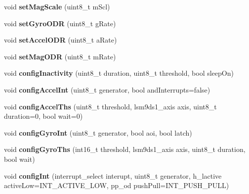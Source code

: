 \begin{DoxyCompactItemize}
\mbox{\label{classLSM9DS1_ad7604159a07b0d088cdfb6ba4a0093b0}} 
void {\bfseries set\+Mag\+Scale} (uint8\+\_\+t m\+Scl)
\item 
\mbox{\label{classLSM9DS1_ab8fc33c8da4fc5c379e880ff57d331fa}} 
void {\bfseries set\+Gyro\+O\+DR} (uint8\+\_\+t g\+Rate)
\item 
\mbox{\label{classLSM9DS1_a76d72839cdecc3f1c4ee6fff578182c5}} 
void {\bfseries set\+Accel\+O\+DR} (uint8\+\_\+t a\+Rate)
\item 
\mbox{\label{classLSM9DS1_a8bc672fba680edc468a643fd58046b41}} 
void {\bfseries set\+Mag\+O\+DR} (uint8\+\_\+t m\+Rate)
\item 
\mbox{\label{classLSM9DS1_a1e318c5e7c1d500c3ab2602c46265354}} 
void {\bfseries config\+Inactivity} (uint8\+\_\+t duration, uint8\+\_\+t threshold, bool sleep\+On)
\item 
\mbox{\label{classLSM9DS1_a1e8ebc6c1e3876d8936197dc93f76717}} 
void {\bfseries config\+Accel\+Int} (uint8\+\_\+t generator, bool and\+Interrupts=false)
\item 
\mbox{\label{classLSM9DS1_acebcf64ab4e6ea7ed7a23c09ef16afe9}} 
void {\bfseries config\+Accel\+Ths} (uint8\+\_\+t threshold, lsm9ds1\+\_\+axis axis, uint8\+\_\+t duration=0, bool wait=0)
\item 
\mbox{\label{classLSM9DS1_a19a341728c4e5b454de045c8a531cf06}} 
void {\bfseries config\+Gyro\+Int} (uint8\+\_\+t generator, bool aoi, bool latch)
\item 
\mbox{\label{classLSM9DS1_ad865cc972960ed476fabd54f698adf6e}} 
void {\bfseries config\+Gyro\+Ths} (int16\+\_\+t threshold, lsm9ds1\+\_\+axis axis, uint8\+\_\+t duration, bool wait)
\item 
\mbox{\label{classLSM9DS1_a5b6948b9d4caf57cfe9e0559a0c7f54c}} 
void {\bfseries config\+Int} (interrupt\+\_\+select interupt, uint8\+\_\+t generator, h\+\_\+lactive active\+Low=I\+N\+T\+\_\+\+A\+C\+T\+I\+V\+E\+\_\+\+L\+OW, pp\+\_\+od push\+Pull=I\+N\+T\+\_\+\+P\+U\+S\+H\+\_\+\+P\+U\+LL)

\end{DoxyCompactItemize}
